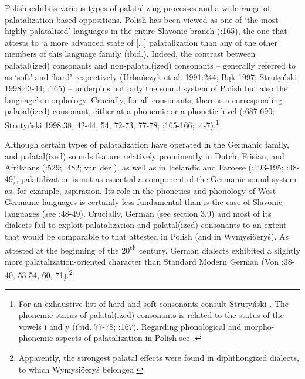 \documentclass[output=paper]{langscibook}
\begin{document}
Polish exhibits various types of palatalizing processes and a wide range of palatalization-based oppositions. Polish has been viewed as one of ‘the most highly palatalized’ languages in the entire Slavonic branch (\citealt{SussexCubberley2006}:165), the one that attests to ‘a more advanced state of […] palatalization than any of the other’ members of this language family (ibid.). Indeed, the contrast between palatal(ized) consonants and non-palatal(ized) consonants – generally referred to as ‘soft’ and ‘hard’ respectively (Urbańczyk et al. 1991:244; Bąk 1997; Strutyński 1998:43-44; \citealt{SussexCubberley2006}:165) – underpins not only the sound system of Polish but also the language’s morphology. Crucially, for all consonants, there is a corresponding palatal(ized) consonant, either at a phonemic or a phonetic level (\citealt{Rothstein1993}:687-690; Strutyński 1998:38, 42-44, 54, 72-73, 77-78; \citealt{SussexCubberley2006}:165-166; \citealt{Gussmann2007}:4-7).\footnote{For an exhaustive list of hard and soft consonants consult Strutyński . The phonemic status of palatal(ized) consonants is related to the status of the vowels i and y (ibid. 77-78; \citealt{SussexCubberley2006}:167). Regarding phonological and morpho-phonemic aspects of palatalization in Polish see \citet{Gussmann2007}.}

Although certain types of palatalization have operated in the Germanic family, and palatal(ized) sounds feature relatively prominently in Dutch, Frisian, and Afrikaans (\citealt{HoekstraTierstna1994}:529; \citealt{Donaldson1994}:482; van der \citealt{Hoek2010}), as well as in Icelandic and Faroese (\citealt{BarnesWeyh1994}:193-195; \citealt{Harbert2007}:48-49), palatalization is not as essential a component of the Germanic sound system as, for example, aspiration. Its role in the phonetics and phonology of West Germanic languages is certainly less fundamental than is the case of Slavonic languages (see \citealt{Harbert2007}:48-49). Crucially, German (see section 3.9) and most of its dialects fail to exploit palatalization and palatal(ized) consonants to an extent that would be comparable to that attested in Polish (and in Wymysiöeryś). As attested at the beginning of the 20\textsuperscript{th} century, German dialects exhibited a slightly more palatalization-oriented character than Standard Modern German (Von \citealt{Unwerth1908}:38-40, 53-54, 60, 71).\footnote{Apparently, the strongest palatal effects were found in diphthongized dialects, to which Wymysiöeryś belonged.}
\end{document}
